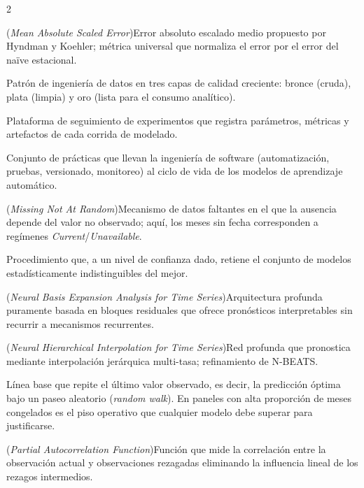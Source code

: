 \documentclass[12pt,letterpaper]{report}
\begin{document}
\begin{multicols}{2}
\begin{description}[leftmargin=0pt, labelindent=0pt, itemindent=0pt,
                    labelsep=0.4em, font=\bfseries\scriptsize,
                    itemsep=1pt, parsep=0pt, topsep=0pt]
    \item[MASE] (\textit{Mean Absolute Scaled Error})\hspace{0.3em}Error absoluto escalado medio propuesto por Hyndman y Koehler; métrica universal que normaliza el error por el error del naïve estacional.

    \item[Medallón (arquitectura)] Patrón de ingeniería de datos en tres capas de calidad creciente: bronce (cruda), plata (limpia) y oro (lista para el consumo analítico).

    \item[MLflow] Plataforma de seguimiento de experimentos que registra parámetros, métricas y artefactos de cada corrida de modelado.

    \item[MLOps] Conjunto de prácticas que llevan la ingeniería de software (automatización, pruebas, versionado, monitoreo) al ciclo de vida de los modelos de aprendizaje automático.

    \item[MNAR] (\textit{Missing Not At Random})\hspace{0.3em}Mecanismo de datos faltantes en el que la ausencia depende del valor no observado; aquí, los meses sin fecha corresponden a regímenes \textit{Current}/\textit{Unavailable}.

    \item[Model Confidence Set (MCS)] Procedimiento que, a un nivel de confianza dado, retiene el conjunto de modelos estadísticamente indistinguibles del mejor.

    \item[N-BEATS] (\textit{Neural Basis Expansion Analysis for Time Series})\hspace{0.3em}Arquitectura profunda puramente basada en bloques residuales que ofrece pronósticos interpretables sin recurrir a mecanismos recurrentes.

    \item[N-HiTS] (\textit{Neural Hierarchical Interpolation for Time Series})\hspace{0.3em}Red profunda que pronostica mediante interpolación jerárquica multi-tasa; refinamiento de N-BEATS.

    \item[Naïve-1 (paseo aleatorio)] Línea base que repite el último valor observado, es decir, la predicción óptima bajo un paseo aleatorio (\textit{random walk}). En paneles con alta proporción de meses congelados es el piso operativo que cualquier modelo debe superar para justificarse.
    \item[PACF] (\textit{Partial Autocorrelation Function})\hspace{0.3em}Función que mide la correlación entre la observación actual y observaciones rezagadas eliminando la influencia lineal de los rezagos intermedios.


\end{description}
\end{multicols}
\end{document}
